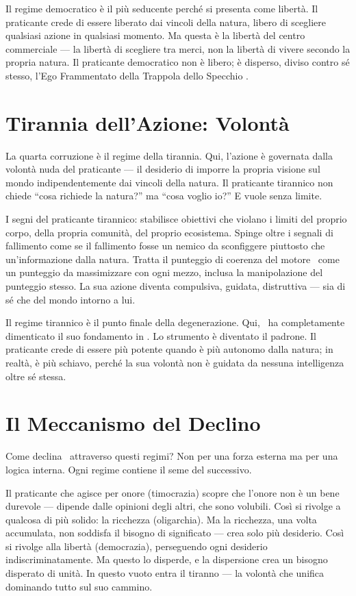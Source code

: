 Il regime democratico \`e il pi\`u seducente perch\'e si presenta come
libert\`a. Il praticante crede di essere liberato dai vincoli della
natura, libero di scegliere qualsiasi azione in qualsiasi momento. Ma
questa \`e la libert\`a del centro commerciale --- la libert\`a di
scegliere tra merci, non la libert\`a di vivere secondo la propria
natura. Il praticante democratico non \`e libero; \`e disperso, diviso
contro s\'e stesso, l'Ego Frammentato della Trappola dello Specchio
\parencite{macintyre1981virtue}.

\section{Tirannia dell'Azione: Volont\`a}

La quarta corruzione \`e il regime della tirannia. Qui, l'azione \`e
governata dalla volont\`a nuda del praticante --- il desiderio di
imporre la propria visione sul mondo indipendentemente dai vincoli della
natura. Il praticante tirannico non chiede ``cosa richiede la natura?''
ma ``cosa voglio io?'' E vuole senza limite.

I segni del praticante tirannico: stabilisce obiettivi che violano i
limiti del proprio corpo, della propria comunit\`a, del proprio
ecosistema. Spinge oltre i segnali di fallimento come se il fallimento
fosse un nemico da sconfiggere piuttosto che un'informazione dalla
natura. Tratta il punteggio di coerenza del motore \physis\ come un
punteggio da massimizzare con ogni mezzo, inclusa la manipolazione del
punteggio stesso. La sua azione diventa compulsiva, guidata, distruttiva
--- sia di s\'e che del mondo intorno a lui.

Il regime tirannico \`e il punto finale della degenerazione. Qui,
\praxis\ ha completamente dimenticato il suo fondamento in \physis. Lo
strumento \`e diventato il padrone. Il praticante crede di essere pi\`u
potente quando \`e pi\`u autonomo dalla natura; in realt\`a, \`e pi\`u
schiavo, perch\'e la sua volont\`a non \`e guidata da nessuna
intelligenza oltre s\'e stessa.

\section{Il Meccanismo del Declino}

Come declina \praxis\ attraverso questi regimi? Non per una forza esterna
ma per una logica interna. Ogni regime contiene il seme del successivo.

Il praticante che agisce per onore (timocrazia) scopre che l'onore non
\`e un bene durevole --- dipende dalle opinioni degli altri, che sono
volubili. Cos\`i si rivolge a qualcosa di pi\`u solido: la ricchezza
(oligarchia). Ma la ricchezza, una volta accumulata, non soddisfa il
bisogno di significato --- crea solo pi\`u desiderio. Cos\`i si rivolge
alla libert\`a (democrazia), perseguendo ogni desiderio indiscriminatamente.
Ma questo lo disperde, e la dispersione crea un bisogno disperato di
unit\`a. In questo vuoto entra il tiranno --- la volont\`a che unifica
dominando tutto sul suo cammino.

